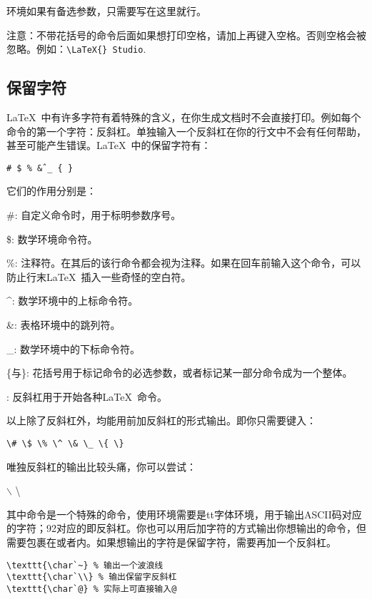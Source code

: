 环境如果有备选参数，只需要写在这里就行。

注意：不带花括号的命令后面如果想打印空格，请加上再键入空格。否则空格会被忽略。例如：\verb+\LaTeX{} Studio+.

\subsection{保留字符}

\LaTeX\ 中有许多字符有着特殊的含义，在你生成文档时不会直接打印。例如每个命令的第一个字符：反斜杠。单独输入一个反斜杠在你的行文中不会有任何帮助，甚至可能产生错误。\LaTeX\ 中的保留字符有：
\begin{center}
\texttt{\# \$ \% \^ \& \_ \{ \} }
\end{center}

它们的作用分别是：
\begin{para}
\item[\#{}:] 自定义命令时，用于标明参数序号。
\item[\${}:] 数学环境命令符。
\item[\%{}:] 注释符。在其后的该行命令都会视为注释。如果在回车前输入这个命令，可以防止行末\LaTeX\ 插入一些奇怪的空白符。
\item[\^{}:] 数学环境中的上标命令符。
\item[\&{}:] 表格环境中的跳列符。
\item[\_{}:] 数学环境中的下标命令符。
\item[\{与\}:] 花括号用于标记命令的必选参数，或者标记某一部分命令成为一个整体。
\item[\char92{}:] 反斜杠用于开始各种\LaTeX\ 命令。
\end{para}

以上除了反斜杠外，均能用前加反斜杠的形式输出。即你只需要键入：
\begin{center}
\verb|\# \$ \% \^ \& \_ \{ \}|
\end{center}

唯独反斜杠的输出比较头痛，你可以尝试：
\begin{codeshow}
$\backslash$ \textbackslash
\texttt{}
\end{codeshow}

其中命令是一个特殊的命令，使用环境需要是tt字体环境，用于输出ASCII码对应的字符；92对应的即反斜杠。你也可以用后加字符的方式输出你想输出的命令，但需要包裹在或者内。如果想输出的字符是保留字符，需要再加一个反斜杠。
\begin{verbatim}
\texttt{\char`~} % 输出一个波浪线
\texttt{\char`\\} % 输出保留字反斜杠
\texttt{\char`@} % 实际上可直接输入@
\end{verbatim}

